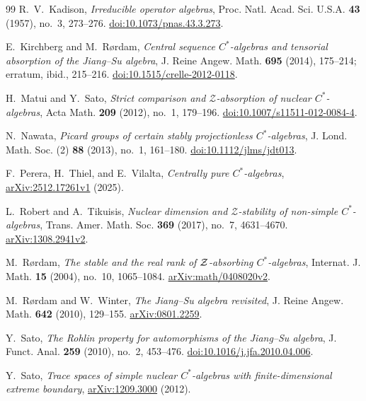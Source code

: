 \begin{thebibliography}{99}
R.~V.~Kadison,
\emph{Irreducible operator algebras},
Proc. Natl. Acad. Sci. U.S.A. \textbf{43} (1957), no.~3, 273--276.
\href{https://doi.org/10.1073/pnas.43.3.273}{doi:10.1073/pnas.43.3.273}.

E.~Kirchberg and M.~R\o rdam,
\emph{Central sequence $C^*$-algebras and tensorial absorption of the Jiang--Su algebra},
J. Reine Angew. Math. \textbf{695} (2014), 175--214;
erratum, ibid., 215--216.
\href{https://doi.org/10.1515/crelle-2012-0118}{doi:10.1515/crelle-2012-0118}.

H.~Matui and Y.~Sato,
\emph{Strict comparison and $\mathcal Z$-absorption of nuclear $C^*$-algebras},
Acta Math. \textbf{209} (2012), no.~1, 179--196.
\href{https://doi.org/10.1007/s11511-012-0084-4}{doi:10.1007/s11511-012-0084-4}.

N.~Nawata, \emph{Picard groups of certain stably projectionless $C^*$-algebras},
J. Lond. Math. Soc. (2) \textbf{88} (2013), no.~1, 161--180.
\href{https://doi.org/10.1112/jlms/jdt013}{doi:10.1112/jlms/jdt013}.

F.~Perera, H.~Thiel, and E.~Vilalta,
\emph{Centrally pure $C^*$-algebras},
\href{https://arxiv.org/abs/2512.17261v1}{arXiv:2512.17261v1} (2025).

L.~Robert and A.~Tikuisis,
\emph{Nuclear dimension and $\mathcal Z$-stability of non-simple $C^*$-algebras},
Trans. Amer. Math. Soc. \textbf{369} (2017), no.~7, 4631--4670.
\href{https://arxiv.org/abs/1308.2941v2}{arXiv:1308.2941v2}.

M.~R{\o}rdam,
\emph{The stable and the real rank of \(\mathcal Z\)-absorbing \(C^*\)-algebras},
Internat. J. Math. \textbf{15} (2004), no.~10, 1065--1084.
\href{https://arxiv.org/abs/math/0408020v2}{arXiv:math/0408020v2}.

M.~R{\o}rdam and W.~Winter,
\emph{The Jiang--Su algebra revisited},
J. Reine Angew. Math. \textbf{642} (2010), 129--155.
\href{https://arxiv.org/abs/0801.2259}{arXiv:0801.2259}.

Y.~Sato,
\emph{The Rohlin property for automorphisms of the Jiang--Su algebra},
J. Funct. Anal. \textbf{259} (2010), no.~2, 453--476.
\href{https://doi.org/10.1016/j.jfa.2010.04.006}{doi:10.1016/j.jfa.2010.04.006}.

Y.~Sato,
\emph{Trace spaces of simple nuclear $C^*$-algebras with
finite-dimensional extreme boundary},
\href{https://arxiv.org/abs/1209.3000}{arXiv:1209.3000} (2012).


\end{thebibliography}
